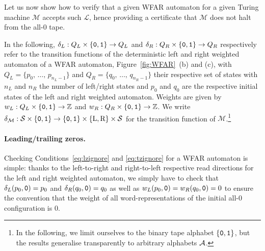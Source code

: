 Let us now show how to verify that a given WFAR automaton for a given Turing machine $\mathcal{M}$ accepts such $\mathcal{L}$, hence providing a certificate that $\mathcal{M}$ does not halt from the all-0 tape.

In the following, $\delta_L: Q_L \times \left\{\texttt{0},\texttt{1}\right\} \to Q_L$ and $\delta_R: Q_R \times \left\{\texttt{0},\texttt{1}\right\} \to Q_R$ respectively refer to the transition functions of the deterministic left and right weighted automaton of a WFAR automaton, \eg Figure~\ref{fig:WFAR}~(b) and (c), with $Q_L = \{p_0, \, \dots, \, p_{n_L-1}\}$ and $Q_R = \{q_0, \, \dots, \, q_{n_R-1}\}$ their respective set of states with $n_L$ and $n_R$ the number of left/right states and $p_0$ and $q_0$ are the respective initial states of the left and right weighted automaton. Weights are given by $w_L: Q_L \times \left\{\texttt{0},\texttt{1}\right\} \to \mathbb{Z}$ and $w_R: Q_R \times \left\{\texttt{0},\texttt{1}\right\} \to \mathbb{Z}$. We write $\delta_\mathcal{M}:\mathcal{S} \times \left\{\texttt{0},\texttt{1}\right\} \to \left\{\texttt{0},\texttt{1}\right\} \times \{\text{L},\text{R}\} \times \mathcal{S}$ for the transition function of $\mathcal{M}$.\footnote{In the following, we limit ourselves to the binary tape alphabet $\left\{\texttt{0},\texttt{1}\right\}$, but the results generalise transparently to arbitrary alphabets $\mathcal{A}$.}

\paragraph{Leading/trailing zeros.} Checking Conditions~\eqref{eq:lzignore} and \eqref{eq:tzignore} for a WFAR automaton is simple: thanks to the left-to-right and right-to-left respective read directions for the left and right weighted automaton, we simply have to check that $\delta_L(p_0,\texttt{0}) = p_0$ and $\delta_R(q_0,\texttt{0}) = q_0$ as well as $w_L(p_0,\texttt{0}) = w_R(q_0,\texttt{0}) = 0$ to ensure the convention that the weight of all word-representations of the initial all-0 configuration is 0.

